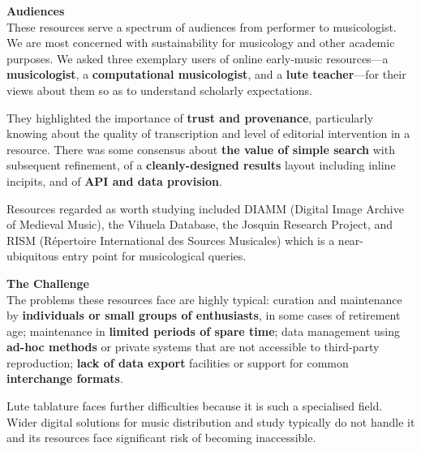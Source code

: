 \documentclass[a0,portrait]{a0poster}
\begin{document}
\begin{multicols}{3}
\begin{sloppypar}
  \vspace{2cm}
  \noindent\textbf{\LARGE Audiences}\\

  \noindent These resources serve a spectrum of audiences from
  performer to musicologist. We are most concerned with sustainability
  for musicology and other academic purposes. We asked three exemplary
  users of online early-music resources---a \textbf{musicologist}, a
  \textbf{computational musicologist}, and a \textbf{lute
    teacher}---for their views about them so as to understand
  scholarly expectations.

  \noindent They highlighted the importance of \textbf{trust and
    provenance}, particularly knowing about the quality of
  transcription and level of editorial intervention in a
  resource. There was some consensus about \textbf{the value of simple
    search} with subsequent refinement, of a \textbf{cleanly-designed
    results} layout including inline incipits, and of \textbf{API and
    data provision}.

  \noindent Resources regarded as worth studying included DIAMM
  (Digital Image Archive of Medieval Music), the Vihuela Database, the
  Josquin Research Project, and RISM (R\'epertoire International des
  Sources Musicales) which is a near-ubiquitous entry point for
  musicological queries.

  \columnbreak
  \noindent\textbf{\LARGE The Challenge}\\

  \noindent The problems these resources face are highly typical:
  curation and maintenance by \textbf{individuals or small groups of
    enthusiasts}, in some cases of retirement age; maintenance in
  \textbf{limited periods of spare time}; data management using
  \textbf{ad-hoc methods} or private systems that are not accessible
  to third-party reproduction; \textbf{lack of data export} facilities
  or support for common \textbf{interchange formats}.

  \noindent Lute tablature faces further difficulties because it is
  such a specialised field. Wider digital solutions for music
  distribution and study typically do not handle it and its resources
  face significant risk of becoming inaccessible.


\end{sloppypar}
\end{multicols}
\end{document}
